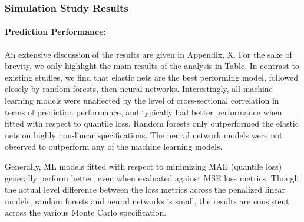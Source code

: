 \documentclass{article}
\begin{document}
\subsubsection{Simulation Study Results}

\paragraph{Prediction Performance:}
An extensive discussion of the results are given in Appendix, X. For the sake of brevity, we only highlight the main results of the analysis in Table. In contrast to existing studies, we find that elastic nets are the best performing model, followed closely by random forests, then neural networks. Interestingly, all machine learning models were unaffected by the level of cross-sectional correlation in terms of prediction performance, and typically had better performance when fitted with respect to quantile loss. Random forests only outperformed the elastic nets on highly non-linear specifications. The neural network models were not observed to outperform any of the machine learning models. 


Generally, ML models fitted with respect to minimizing MAE (quantile loss) generally perform better, even when evaluated against MSE loss metrics. Though the actual level difference between the loss metrics across the penalized linear models, random forests and neural networks is small, the results are consistent across the various Monte Carlo specification. 



\end{document}
